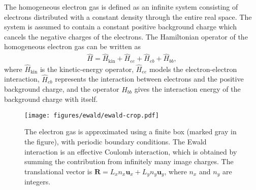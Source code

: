 \documentclass[a4paper,12pt]{report}
\begin{document}


The homogeneous electron gas is defined as an infinite system
consisting of electrons distributed with a constant density 
through the entire real space. The system is assumed to 
contain a constant positive background charge which cancels
the negative charges of the electrons. The Hamiltonian 
operator of the homogeneous electron gas can be written as
\cite{fetter}
\begin{align}
  \hat{H} = \hat{H}_{\text{kin}} + \hat{H}_{ee} + \hat{H}_{eb} 
  + \hat{H}_{bb},
\end{align}
where $\hat{H}_{\text{kin}}$ is the kinetic-energy operator,
$\hat{H}_{ee}$ models the electron-electron interaction,
$\hat{H}_{eb}$ represents the interaction between electrons 
and the positive background charge, and the operator 
$\hat{H}_{bb}$ gives the interaction energy of the background
charge with itself. 


\begin{figure} 
  \centering
  \texttt{[image: figures/ewald/ewald-crop.pdf]}
  \caption{The electron gas is approximated using a finite 
    box (marked gray in the figure), with periodic boundary 
    conditions. The Ewald interaction is an effective Coulomb 
    interaction, which is obtained by summing the contribution
    from infinitely many image charges. The translational vector
    is $\mathbf{R} = L_{x}n_{x}\mathbf{u}_{x} + L_{y}n_{y}
    \mathbf{u}_{y}$, where $n_{x}$ and $n_{y}$ are integers.}
  \label{fig:ewald}
\end{figure}
\end{document}
